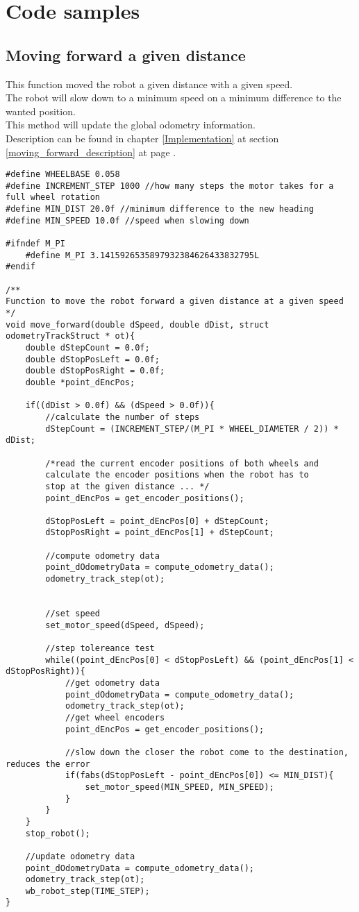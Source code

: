 \chapter{Code samples}
\label{code_samples}

\section{Moving forward a given distance}
\label{moving_forward_code}
This function moved the robot a given distance with a given speed.\\
The robot will slow down to a minimum speed on a minimum difference to the wanted position.\\
This method will update the global odometry information.\\
Description can be found in chapter \ref{Implementation} at section \ref{moving_forward_description} at page \pageref{moving_forward_description}.
\begin{lstlisting}[caption = {Moving forward}]
#define WHEELBASE 0.058 
#define INCREMENT_STEP 1000 //how many steps the motor takes for a full wheel rotation
#define MIN_DIST 20.0f //minimum difference to the new heading
#define MIN_SPEED 10.0f //speed when slowing down

#ifndef M_PI
	#define M_PI 3.1415926535897932384626433832795L
#endif

/**
Function to move the robot forward a given distance at a given speed
*/
void move_forward(double dSpeed, double dDist, struct odometryTrackStruct * ot){ 
	double dStepCount = 0.0f;
	double dStopPosLeft = 0.0f;
	double dStopPosRight = 0.0f;
	double *point_dEncPos;	
	
	if((dDist > 0.0f) && (dSpeed > 0.0f)){
		//calculate the number of steps
		dStepCount = (INCREMENT_STEP/(M_PI * WHEEL_DIAMETER / 2)) * dDist;
		
		/*read the current encoder positions of both wheels and
		calculate the encoder positions when the robot has to
		stop at the given distance ... */
		point_dEncPos = get_encoder_positions();
		
		dStopPosLeft = point_dEncPos[0] + dStepCount;
		dStopPosRight = point_dEncPos[1] + dStepCount;
		
		//compute odometry data
		point_dOdometryData = compute_odometry_data();
		odometry_track_step(ot);
		
		
		//set speed
		set_motor_speed(dSpeed, dSpeed); 
		
		//step tolereance test
		while((point_dEncPos[0] < dStopPosLeft) && (point_dEncPos[1] < dStopPosRight)){
			//get odometry data
			point_dOdometryData = compute_odometry_data();
			odometry_track_step(ot);
			//get wheel encoders
			point_dEncPos = get_encoder_positions();
			
			//slow down the closer the robot come to the destination, reduces the error
			if(fabs(dStopPosLeft - point_dEncPos[0]) <= MIN_DIST){
				set_motor_speed(MIN_SPEED, MIN_SPEED);
			}
		}
	}
	stop_robot();
	
	//update odometry data
	point_dOdometryData = compute_odometry_data();
	odometry_track_step(ot);
	wb_robot_step(TIME_STEP);
}
\end{lstlisting}

